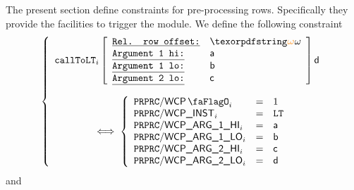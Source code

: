 The present section define constraints for pre-processing rows.
Specifically they provide the facilities to trigger the \wcpMod{} module.
We define the following constraint
\[
    \left\{ \begin{array}{l}
        \callToLt
        {i}{\relof}
        {\col{a}}{\col{b}}
        {\col{c}}{\col{d}} \vspace{4mm} \\
        \qquad \qquad \iff
        \left\{ \begin{array}{lcl}
                    \ppWcpFlag       _{i} & = & 1         \\
                    \ppWcpInst       _{i} & = & \inst{LT} \\
                    \ppWcpArgOneHi   _{i} & = & \col{a}   \\
                    \ppWcpArgOneLo   _{i} & = & \col{b}   \\
                    \ppWcpArgTwoHi   _{i} & = & \col{c}   \\
                    \ppWcpArgTwoLo   _{i} & = & \col{d}   \\
                \end{array} \right.
    \end{array} \right.
\]
and
